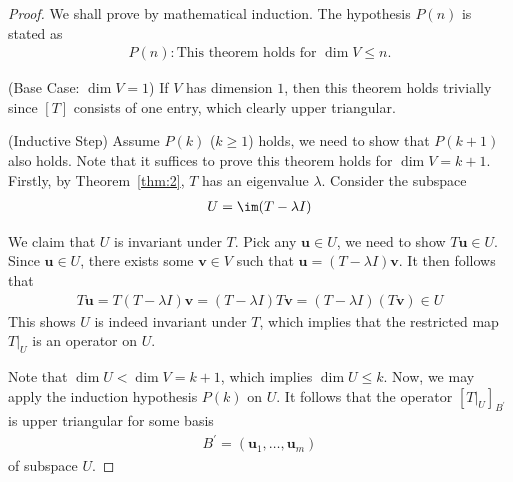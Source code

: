 \documentclass[thmcnt=section, color=blue, 12pt]{my-elegantbook}
\begin{document}
\begin{proof}
    We shall prove by mathematical induction. The hypothesis $P(n)$ is stated as
    \begin{align*}
        P(n): \text{This theorem holds for $\dim V \leq n$.}
    \end{align*} 

    \par (Base Case: $\dim V = 1$) If $V$ has dimension $1$, then this theorem holds trivially since $[T]$ consists of one entry, which clearly upper triangular.

    \par (Inductive Step) Assume $P(k)$ ($k \geq 1$) holds, we need to show that $P(k+1)$ also holds. Note that it suffices to prove this theorem holds for $\dim V = k+1$. Firstly, by Theorem~\ref{thm:2}, $T$ has an eigenvalue $\lambda$. Consider the subspace
    \begin{align*}
        U = \im(T - \lambda I)
    \end{align*}

    \par We claim that $U$ is invariant under $T$. Pick any $\mathbf{u} \in U$, we need to show $T \mathbf{u} \in U$. Since $\mathbf{u} \in U$, there exists some $\mathbf{v} \in V$ such that $\mathbf{u} = (T - \lambda I) \mathbf{v}$. It then follows that 
    \begin{align*}
        T \mathbf{u} = T(T - \lambda I) \mathbf{v}
        = (T - \lambda I) T \mathbf{v}
        = (T - \lambda I) (T \mathbf{v})
        \in U
    \end{align*}
    This shows $U$ is indeed invariant under $T$, which implies that the restricted map $T|_{U}$ is an operator on $U$.

    \par Note that $\dim U < \dim V = k+1$, which implies $\dim U \leq k$. Now, we may apply the induction hypothesis $P(k)$ on $U$. It follows that the operator $[T|_U]_{B^\prime}$ is upper triangular for some basis
    \begin{align*}
        B^\prime = (\mathbf{u}_1, \ldots, \mathbf{u}_m)
    \end{align*}
    of subspace $U$.


\end{proof}
\end{document}
